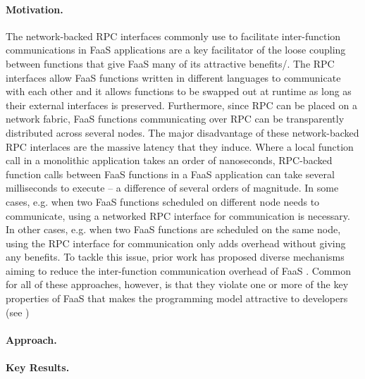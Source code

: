 \documentclass[../main.tex]{subfiles}
\begin{document}
\begin{refsection}
\paragraph{Motivation.}
The network-backed RPC interfaces commonly use to facilitate
inter-function communications in FaaS applications are a key
facilitator of the loose coupling between functions that give FaaS
many of its attractive benefits/. The RPC interfaces allow FaaS
functions written in different languages to communicate with each
other and it allows functions to be swapped out at runtime as long as
their external interfaces is preserved. Furthermore, since RPC can be
placed on a network fabric, FaaS functions communicating over RPC can
be transparently distributed across several nodes. The major
disadvantage of these network-backed RPC interlaces are the massive
latency that they induce. Where a local function call in a monolithic
application takes an order of nanoseconds, RPC-backed function calls
between FaaS functions in a FaaS application can take several
milliseconds to execute -- a difference of several orders of
magnitude. In some cases, e.g. when two FaaS functions scheduled on
different node needs to communicate, using a networked RPC interface
for communication is necessary. In other cases, e.g. when two FaaS
functions are scheduled on the same node, using the RPC interface for
communication only adds overhead without giving any benefits. To
tackle this issue, prior work has proposed diverse mechanisms aiming
to reduce the inter-function communication overhead of FaaS
\cite{kotni21_faast,
  mahgoub22_wisef,barcelona-pons19_faas_track,sreekanti20_cloud,shillaker20_faasm,jia21_night}.  Common for all of these approaches, however, is that they violate one or more of the key properties of FaaS that makes the programming model attractive to developers (see )

\paragraph{Approach.}


\paragraph{Key Results.}



\ifx\chapincluded\undefined
  \printbibliography
  \end{refsection}
 \fi
\end{document}
